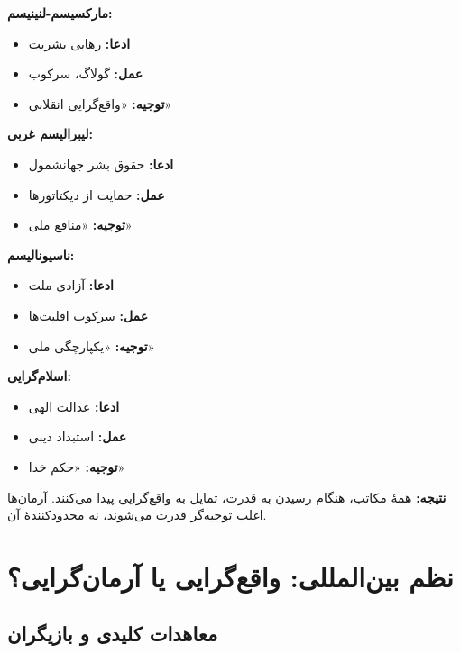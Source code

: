 \begin{tcolorbox}[
    enhanced,
    colback=leftred!8,
    colframe=leftred,
    boxrule=1.5pt,
    arc=5pt,
    fonttitle=\bfseries,
    title={\rl{🔴 تحلیل انتقادی: تناقضات}}
]

\textbf{مارکسیسم-لنینیسم:}
\begin{itemize}
    \item \textbf{ادعا:} رهایی بشریت
    \item \textbf{عمل:} گولاگ، سرکوب
    \item \textbf{توجیه:} «واقع‌گرایی انقلابی»
\end{itemize}

\textbf{لیبرالیسم غربی:}
\begin{itemize}
    \item \textbf{ادعا:} حقوق بشر جهانشمول
    \item \textbf{عمل:} حمایت از دیکتاتورها
    \item \textbf{توجیه:} «منافع ملی»
\end{itemize}



\textbf{ناسیونالیسم:}
\begin{itemize}
    \item \textbf{ادعا:} آزادی ملت
    \item \textbf{عمل:} سرکوب اقلیت‌ها
    \item \textbf{توجیه:} «یکپارچگی ملی»
\end{itemize}

\textbf{اسلام‌گرایی:}
\begin{itemize}
    \item \textbf{ادعا:} عدالت الهی
    \item \textbf{عمل:} استبداد دینی
    \item \textbf{توجیه:} «حکم خدا»
\end{itemize}


\vspace{3mm}
\textbf{نتیجه:} همهٔ مکاتب، هنگام رسیدن به قدرت، تمایل به واقع‌گرایی پیدا می‌کنند. آرمان‌ها اغلب توجیه‌گر قدرت می‌شوند، نه محدودکنندهٔ آن.
\end{tcolorbox}

\section{نظم بین‌المللی: واقع‌گرایی یا آرمان‌گرایی؟}

\subsection{معاهدات کلیدی و بازیگران}

